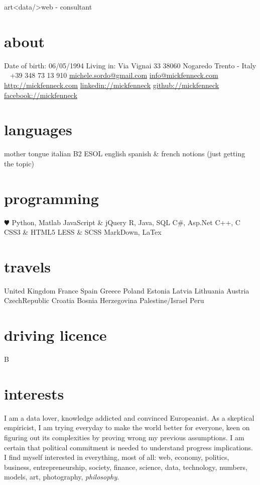 \documentclass[]{friggeri-cv}
\begin{document}
       {art<data/>web - consultant}


\begin{aside}
  \section{about}
    Date of birth:
    06/05/1994
    Living in:
    Via Vignai 33
    38060 Nogaredo
    Trento - Italy
    ~
    +39 348 73 13 910
    \href{mailto:michele.sordo@gmail.com}{michele.sordo@gmail.com}
    \href{mailto:info@mickfenneck.com}{info@mickfenneck.com}
    \href{http://mickfenneck.com}{http://mickfenneck.com}
    \href{http://linkedin.com/in/mickfenneck}{linkedin://mickfenneck}
    \href{http://github.com/mickfenneck}{github://mickfenneck}
    \href{http://facebook.com/mickfenneck}{facebook://mickfenneck}
  \section{languages}
    mother tongue italian
    B2 ESOL english
    spanish \& french notions
    (just getting the topic)
  \section{programming}
    {\color{red} $\varheartsuit$} Python, Matlab
    JavaScript \& jQuery
    R, Java, SQL
    C\#, Asp.Net
    C++, C
    CSS3 \& HTML5
    LESS \& SCSS
    MarkDown, LaTex
\section{travels}
    United Kingdom
    France
    Spain
    Greece
    Poland
    Estonia
    Latvia
    Lithuania
    Austria
    CzechRepublic
    Croatia
    Bosnia Herzegovina
    Palestine/Israel
    Peru
\section{driving licence}
    B
\end{aside}






\section{interests}
I am a data lover, knowledge addicted and convinced Europeanist. As a skeptical empiricist, I am trying everyday to make the world better for everyone, keen on figuring out its complexities by proving wrong my previous assumptions. I am certain that political commitment is needed to understand progress implications. I find myself interested in everything, most of all: web, economy, politics, business, entrepreneurship, society, finance, science, data, technology, numbers, models, art, photography, \emph{philosophy}.
\end{document}
